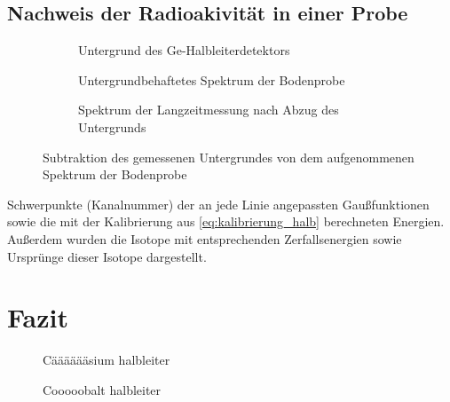 \documentclass[11pt, a4paper]{article}
\numberwithin{equation}{section}
\begin{document}
\subsection{Nachweis der Radioakivität in einer Probe}

\begin{figure}[hp]
	\centering
	\begin{subfigure}[b]{0.65\textwidth}
		\resizebox{!}{0.28\textheight}{
			
		}
		\caption{Untergrund des Ge-Halbleiterdetektors}
		\label{fig:untergrund}
	\end{subfigure}
	
	\begin{subfigure}[b]{0.65\textwidth}
		\resizebox{!}{0.28\textheight}{
			
		}
		\caption{Untergrundbehaftetes Spektrum der Bodenprobe}
		\label{fig:probe_mit_untergrund}
	\end{subfigure}
	
	\begin{subfigure}[b]{0.65\textwidth}
		\resizebox{!}{0.28\textheight}{
			
		}
		\caption{Spektrum der Langzeitmessung nach Abzug des Untergrunds}
		\label{fig:probe_ohne_untergrund}
	\end{subfigure}
	\caption{Subtraktion des gemessenen Untergrundes von dem aufgenommenen Spektrum der Bodenprobe}
	\label{fig:langzeitmessung_untergrundabzug}
\end{figure}

\begin{table}
	\centering
	\resizebox{\textwidth}{!}{
	
	}
	\caption{Schwerpunkte (Kanalnummer) der an jede Linie angepassten Gaußfunktionen sowie die mit der Kalibrierung aus \eqref{eq:kalibrierung_halb} berechneten Energien. Außerdem wurden die Isotope mit entsprechenden Zerfallsenergien sowie Ursprünge dieser Isotope dargestellt.}
\end{table}

\section{Fazit}

\begin{figure}[h]
	\centering
	
	\caption{Cääääääsium halbleiter}
	\label{fig:halb_caesium_spektrum}
\end{figure}

\begin{figure}[h]
	\centering
	
	\caption{Cooooobalt halbleiter}
	\label{fig:halb_cobalt_spektrum}
\end{figure}
\end{document}
